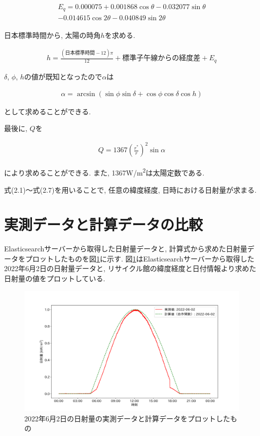 \begin{eqnarray}
  \begin{split}
    E_q =  0.000075+0.001868\cos \theta-0.032077\sin \theta\\
    -0.014615\cos 2\theta-0.040849\sin 2\theta
  \end{split}
\end{eqnarray}

日本標準時間から, 太陽の時角$h$を求める.

\begin{eqnarray}
  h = \frac{(日本標準時間-12)\pi}{12}+標準子午線からの経度差+E_q
\end{eqnarray}

$\delta$, $\phi$, $h$の値が既知となったので$\alpha$は

\begin{eqnarray}
  \alpha = \arcsin (\sin \phi\sin \delta+\cos \phi\cos \delta\cos h)
\end{eqnarray}

として求めることができる.

最後に, $Q$を

\begin{eqnarray}
  Q = 1367(\frac{r^{*}}{r})^{2}\sin \alpha
\end{eqnarray}

により求めることができる.
また, 1367\si{\watt}/\si{\metre\squared}は太陽定数である.

式(2.1)～式(2.7)を用いることで, 任意の緯度経度, 日時における日射量が求まる.


\section{実測データと計算データの比較}
Elasticsearchサーバーから取得した日射量データと, 計算式から求めた日射量データをプロットしたものを図\ref{20220529-p1}に示す.
図\ref{20220529-p1}はElasticsearchサーバーから取得した2022年6月2日の日射量データと, リサイクル館の緯度経度と日付情報より求めた日射量の値をプロットしている.

\begin{figure}[h]
  \begin{center}
    \includegraphics[width=160mm]{sotu/figure/2/original-20220602-corr.png}
    \caption{2022年6月2日の日射量の実測データと計算データをプロットしたもの}
    \label{20220529-p1}
  \end{center}
\end{figure}

